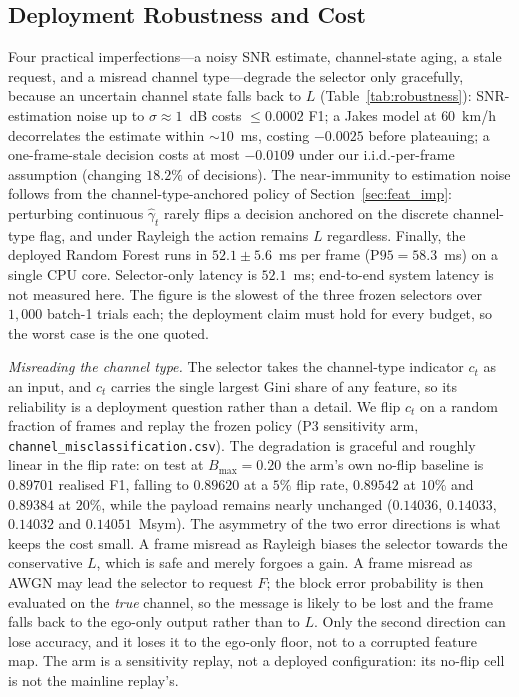 \documentclass[journal]{IEEEtran}
\begin{document}
\subsection{Deployment Robustness and Cost}\label{sec:robustness}

Four practical imperfections---a noisy SNR estimate, channel-state aging, a stale request, and a misread channel type---degrade the selector only gracefully, because an uncertain channel state falls back to $L$ (Table~\ref{tab:robustness}): SNR-estimation noise up to $\sigma\approx1$~dB costs $\le0.0002$ F1; a Jakes model at $60$~km/h decorrelates the estimate within ${\sim}10$~ms, costing $-0.0025$ before plateauing; a one-frame-stale decision costs at most $-0.0109$ under our i.i.d.-per-frame assumption (changing $18.2\%$ of decisions). The near-immunity to estimation noise follows from the channel-type-anchored policy of Section~\ref{sec:feat_imp}: perturbing continuous $\hat\gamma_t$ rarely flips a decision anchored on the discrete channel-type flag, and under Rayleigh the action remains $L$ regardless. Finally, the deployed
Random Forest runs in $52.1\pm5.6$~ms per frame ($\mathrm{P95}=58.3$~ms) on a single CPU
core. Selector-only latency is $52.1$~ms; end-to-end system latency is not measured here. The
figure is the slowest of the three frozen selectors over $1{,}000$ batch-1 trials each; the
deployment claim must hold for every budget, so the worst case is the one quoted.

\emph{Misreading the channel type.} The selector takes the channel-type indicator $c_t$ as an
input, and $c_t$ carries the single largest Gini share of any feature, so its reliability is a
deployment question rather than a detail. We flip $c_t$ on a random fraction of frames and replay
the frozen policy (P3 sensitivity arm, \texttt{channel\_misclassification.csv}). The degradation is
graceful and roughly linear in the flip rate: on test at $B_{\max}=0.20$ the arm's own no-flip
baseline is $0.89701$ realised F1, falling to $0.89620$ at a $5\%$ flip rate, $0.89542$ at $10\%$
and $0.89384$ at $20\%$, while the payload remains nearly unchanged ($0.14036$, $0.14033$,
$0.14032$ and $0.14051$~Msym). The asymmetry of the two error directions is what keeps the cost
small. A frame misread as Rayleigh biases the selector towards the conservative $L$, which is safe
and merely forgoes a gain. A frame misread as AWGN may lead the selector to request $F$; the block
error probability is then evaluated on the \emph{true} channel, so the message is likely to be lost
and the frame falls back to the ego-only output rather than to $L$. Only the second direction can
lose accuracy, and it loses it to the ego-only floor, not to a corrupted feature map.
The arm is a sensitivity replay, not a deployed configuration: its no-flip cell is not the mainline
replay's.
\end{document}
